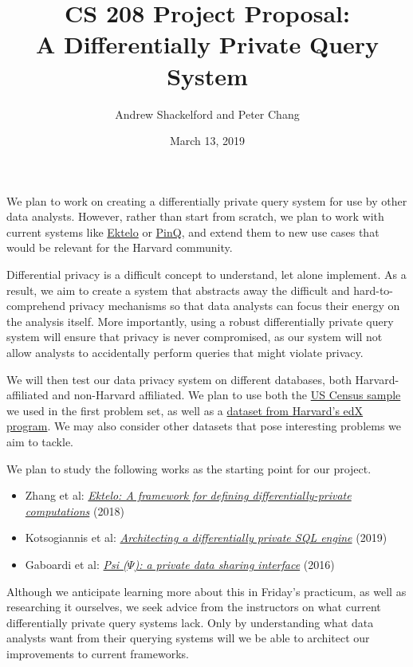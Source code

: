 \documentclass[12pt]{article}
\title{CS 208 Project Proposal:\\ A Differentially Private Query System}
\author{Andrew Shackelford and Peter Chang}
\date{March 13, 2019}
\begin{document}
\maketitle

We plan to work on creating a differentially private query system for use by other data analysts. However, rather than start from scratch, we plan to work with current systems like \href{https://github.com/ektelo}{Ektelo} or \href{https://www.microsoft.com/en-us/research/project/privacy-integrated-queries-pinq/}{PinQ}, and extend them to new use cases that would be relevant for the Harvard community.

\medskip

Differential privacy is a difficult concept to understand, let alone implement. As a result, we aim to create a system that abstracts away the difficult and hard-to-comprehend privacy mechanisms so that data analysts can focus their energy on the analysis itself. More importantly, using a robust differentially private query system will ensure that privacy is never compromised, as our system will not allow analysts to accidentally perform queries that might violate privacy.

\medskip

We will then test our data privacy system on different databases, both Harvard-affiliated and non-Harvard affiliated. We plan to use both the \href{https://github.com/privacytoolsproject/cs208/blob/master/data/FultonPUMS5full.csv}{US Census sample} we used in the first problem set, as well as a \href{http://dx.doi.org/10.2139/ssrn.2381263}{dataset from Harvard's edX program}. We may also consider other datasets that pose interesting problems we aim to tackle.

\bigskip

We plan to study the following works as the starting point for our project.
\begin{itemize}
    \item Zhang et al: \href{https://dl.acm.org/citation.cfm?doid=3183713.3196921}{\textit{Ektelo: A framework for defining differentially-private computations}} (2018)
    
    \item Kotsogiannis et al: \href{http://cidrdb.org/cidr2019/papers/p125-kotsogiannis-cidr19.pdf}{\textit{Architecting a differentially private SQL engine}} (2019) 
    
    \item Gaboardi et al: \href{https://arxiv.org/abs/1609.04340}{\textit{Psi ($\Psi$): a private data sharing interface}} (2016)
    
\end{itemize}

Although we anticipate learning more about this in Friday's practicum, as well as researching it ourselves, we seek advice from the instructors on what current differentially private query systems lack. Only by understanding what data analysts want from their querying systems will we be able to architect our improvements to current frameworks.
\end{document}
